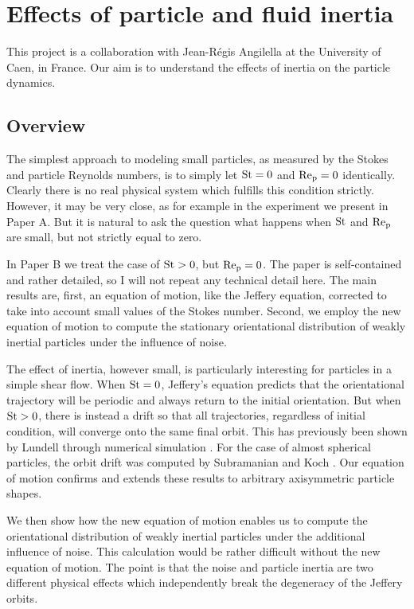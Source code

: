 \documentclass[thesis.tex]{subfiles}
\begin{document}
\chapter{Effects of particle and fluid inertia}

This project is a collaboration with Jean-R\'egis Angilella at the University of Caen, in France. Our aim is to understand the effects of inertia on the particle dynamics.

\section{Overview}

The simplest approach to modeling small particles, as measured by the Stokes and particle Reynolds numbers, is to simply let $\mbox{St}=0$ and $\mbox{Re}_{\mathrm p}=0$ identically. Clearly there is no real physical system which fulfills this condition strictly. However, it may be very close, as for example in the experiment we present in Paper A. But it is natural to ask the question what happens when $\mbox{St}$ and $\mbox{Re}_{\mathrm p}$ are small, but not strictly equal to zero.

In Paper B we treat the case of $\mbox{St}>0$, but $\mbox{Re}_{\mathrm p}=0$. The paper is self-contained and rather detailed, so I will not repeat any technical detail here. The main results are, first, an equation of motion, like the Jeffery equation, corrected to take into account small values of the Stokes number. Second, we employ the new equation of motion to compute the stationary orientational distribution of weakly inertial particles under the influence of noise. 

The effect of inertia, however small, is particularly interesting for particles in a simple shear flow. When $\mbox{St}=0$, Jeffery's equation predicts that the orientational trajectory will be periodic and always return to the initial orientation. But when $\mbox{St}>0$, there is instead a drift so that all trajectories, regardless of initial condition, will converge onto the same final orbit. This has previously been shown by Lundell through numerical simulation \cite{lundell2010}. For the case of almost spherical particles, the orbit drift was computed by Subramanian and Koch \cite{subramanian2006}. Our equation of motion confirms and extends these results to arbitrary axisymmetric particle shapes.

We then show how the new equation of motion enables us to compute the orientational distribution of weakly inertial particles under the additional influence of noise. This calculation would be rather difficult without the new equation of motion. The point is that the noise and particle inertia are two different physical effects which independently break the degeneracy of the Jeffery orbits. 
\end{document}
